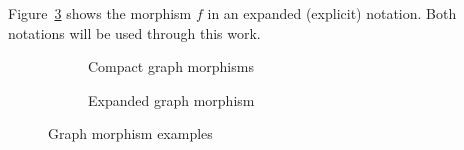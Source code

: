 \begin{example}
  Figure~\ref{fig:gts:expanded-graph-morphism} shows the morphism $f$ in an expanded (explicit) notation. Both notations will be used through this work.
\begin{figure}[!ht]
  \centering
  \begin{subfigure}[t]{.5\textwidth}
    \centerline{}
  \caption{Compact graph morphisms}\label{fig:gts:compact-graph-morphism}
\end{subfigure}%
\begin{subfigure}[t]{.5\textwidth}
  \centerline{}
  \caption{Expanded graph morphism}\label{fig:gts:expanded-graph-morphism}
  \end{subfigure}
  \caption{Graph morphism examples}
\end{figure}

\end{example}

